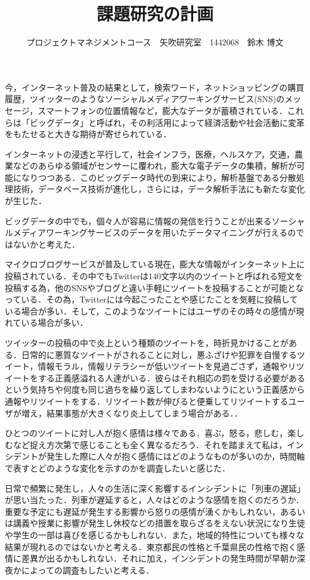 \documentclass[uplatex,twocolumn,dvipdfmx]{jsarticle}
\title{\vspace{-5mm}\fontsize{14pt}{0pt}\selectfont 課題研究の計画}
\author{\normalsize プロジェクトマネジメントコース　矢吹研究室　1442068　鈴木 博文}
\date{}
\begin{document}
\fontsize{10.5pt}{\baselineskip}\selectfont
\maketitle


今，インターネット普及の結果として，検索ワード，ネットショッピングの購買履歴，ツイッターのようなソーシャルメディアワーキングサービス(SNS)のメッセージ，スマートフォンの位置情報など，膨大なデータが蓄積されている．これらは「ビッグデータ」と呼ばれ，その利活用によって経済活動や社会活動に変革をもたせると大きな期待が寄せられている．

インターネットの浸透と平行して，社会インフラ，医療，ヘルスケア，交通，農業などのあらゆる領域がセンサーに覆われ，膨大な電子データの集積，解析が可能になりつつある．このビッグデータ時代の到来により，解析基盤である分散処理技術，データベース技術が進化し，さらには，データ解析手法にも新たな変化が生じた\cite{bib1}．

ビッグデータの中でも，個々人が容易に情報の発信を行うことが出来るソーシャルメディアワーキングサービスのデータを用いたデータマイニングが行えるのではないかと考えた．

マイクロブログサービスが普及している現在，膨大な情報がインターネット上に投稿されている．その中でもTwitterは140文字以内のツイートと呼ばれる短文を投稿する為，他のSNSやブログと違い手軽にツイートを投稿することが可能となっている．その為，Twitterには今起こったことや感じたことを気軽に投稿している場合が多い．そして，このようなツイートにはユーザのその時々の感情が現れている場合が多い．\cite{bib2}

ツイッターの投稿の中で炎上という種類のツイートを，時折見かけることがある．日常的に悪質なツイートがされることに対し，悪ふざけや犯罪を自慢するツイート，情報モラル，情報リテラシーが低いツイートを見過ごさず，通報やリツイートをする正義感溢れる人達がいる．彼らはそれ相応の罰を受ける必要があるという気持ちや何度も同じ過ちを繰り返してしまわないようにという正義感から通報やリツイートをする．リツイート数が伸びると便乗してリツイートするユーザが増え，結果事態が大きくなり炎上してしまう場合がある．\cite{bib3}．

ひとつのツイートに対し人が抱く感情は様々である．喜ぶ，怒る，悲しむ，楽しむなど捉え方次第で感じることも全く異なるだろう．それを踏まえて私は，インシデントが発生した際に人々が抱く感情にはどのようなものが多いのか，時間軸で表すとどのような変化を示すのかを調査したいと感じた．

日常で頻繁に発生し，人々の生活に深く影響するインシデントに「列車の遅延」が思い当たった．列車が遅延すると，人々はどのような感情を抱くのだろうか．重要な予定にも遅延が発生する影響から怒りの感情が湧くかもしれない，あるいは講義や授業に影響が発生し休校などの措置を取らざるをえない状況になり生徒や学生の一部は喜びを感じるかもしれない．また，地域的特性についても様々な結果が現れるのではないかと考える．東京都民の性格と千葉県民の性格で抱く感情に差異が出るかもしれない．それに加え，インシデントの発生時間が早朝か深夜かによっての調査もしたいと考える．
\end{document}
